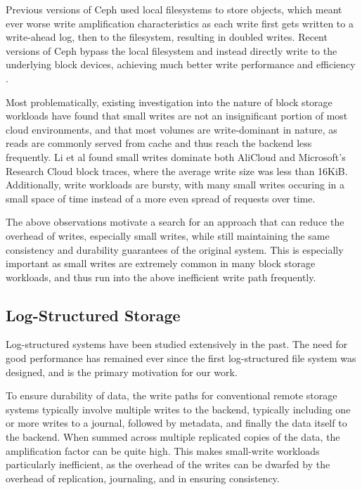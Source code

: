 Previous versions of Ceph used local filesystems to store objects, which meant
ever worse write amplification characteristics as each write first gets written
to a write-ahead log, then to the filesystem, resulting in doubled writes.
Recent versions of Ceph bypass the local filesystem and instead directly write
to the underlying block devices, achieving much better write performance and
efficiency \cite{aghayev2019file}.

Most problematically, existing investigation into the nature of block storage
workloads have found that small writes are not an insignificant portion of most
cloud environments, and that most volumes are write-dominant in nature, as reads
are commonly served from cache and thus reach the backend less frequently.  Li
et al \cite{li2020depth} found small writes dominate both AliCloud and
Microsoft's Research Cloud block traces, where the average write size was less
than 16KiB.  Additionally, write workloads are bursty, with many small writes
occuring in a small space of time instead of a more even spread of requests over
time.

The above observations motivate a search for an approach that can reduce the
overhead of writes, especially small writes, while still maintaining the same
consistency and durability guarantees of the original system. This is especially
important as small writes are extremely common in many block storage workloads,
and thus run into the above inefficient write path frequently.


\subsection{Log-Structured Storage}

Log-structured systems have been studied extensively in the past. The need for
good performance has remained ever since the first log-structured file system
was designed, and is the primary motivation for our work.

To ensure durability of data, the write paths for conventional remote storage
systems typically involve multiple writes to the backend, typically including
one or more writes to a journal, followed by metadata, and finally the data
itself to the backend. When summed across multiple replicated copies of the
data, the amplification factor can be quite high. This makes small-write
workloads particularly inefficient, as the overhead of the writes can be
dwarfed by the overhead of replication, journaling, and in ensuring consistency.

